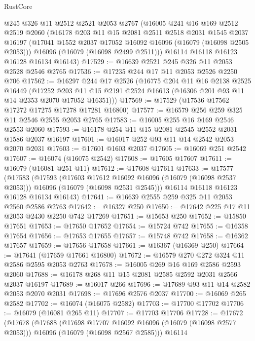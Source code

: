 \begin{lexlean}{RustCore}
\begin{coremodule}
    @245
    @326
    @11
    @2512
    @2521
    @2053
    @2767
    (@16005
      @241
      @16
      @169
      @2512
      @2519
      @2060
      (@16178
        @203
        @11
        @15
        @2081
        @2511
        @2518
        @2031
        @1545
        @2037
        @16197
        (@17041 @1552 @2037 @17052 @16092 @16096 (@16079 (@16098 @2505 @2053)))
        @16096
        (@16079 (@16098 @2499 @2511)))
      @16114
      @16118
      @16123
      @16128
      @16134
      @16143)
@17529 := @16639 @2521 @245 @326 @11 @2053 @2528 @2546 @2765
@17536 := @17235 @244 @17 @11 @2053 @2526 @2250 @706
@17562 := @16297
    @244
    @17
    @2526
    (@16775
      @204
      @11
      @16
      @2138
      @2525
      @16449
      (@17252 @203 @11 @15 @2191 @2524 @16613 (@16306 @201 @93 @11 @14 @2353 @2070 @17052 @16351)))
@17569 := @17529 (@17536 @17562 @17272 @17275 @17278 @17281 @16800)
@17577 := @16579 @256 @259 @325 @11 @2546 @2555 @2053 @2765
@17583 := @16005 @255 @16 @169 @2546 @2553 @2060
@17593 := @16178 @254 @11 @15 @2081 @2545 @2552 @2031 @1586 @2037 @16197
@17601 := @16017 @252 @93 @11 @14 @2542 @2053 @2070 @2031
@17603 := @17601 @1603 @2037
@17605 := @16069 @251 @2542
@17607 := @16074 (@16075 @2542)
@17608 := @17605 @17607
@17611 := @16079 (@16081 @251 @11)
@17612 := @17608 @17611
@17633 := @17577
    (@17583
      (@17593
        (@17603 @17612 @16092 @16096 (@16079 (@16098 @2537 @2053)))
        @16096
        (@16079 (@16098 @2531 @2545)))
      @16114
      @16118
      @16123
      @16128
      @16134
      @16143)
@17641 := @16639 @2555 @259 @325 @11 @2053 @2560 @2586 @2763
@17642 := @16327 @250
@17650 := @17642 @225 @17 @11 @2053 @2430 @2250 @742 @17269
@17651 := @15653 @250
@17652 := @15850 @17651
@17653 := @17650 @17652
@17654 := @15724 @742
@17655 := @16358 @17654
@17656 := @17653 @17655
@17657 := @15748 @742
@17658 := @16362 @17657
@17659 := @17656 @17658
@17661 := @16367 (@16369 @250)
@17664 := @17641 (@17659 @17661 @16800)
@17672 := @16579 @270 @272 @324 @11 @2586 @2595 @2053 @2763
@17678 := @16005 @269 @16 @169 @2586 @2593 @2060
@17688 := @16178 @268 @11 @15 @2081 @2585 @2592 @2031 @2566 @2037 @16197
@17689 := @16017 @266
@17696 := @17689 @93 @11 @14 @2582 @2053 @2070 @2031
@17698 := @17696 @2576 @2037
@17700 := @16069 @265 @2582
@17702 := @16074 (@16075 @2582)
@17703 := @17700 @17702
@17706 := @16079 (@16081 @265 @11)
@17707 := @17703 @17706
@17728 := @17672
    (@17678
      (@17688
        (@17698 @17707 @16092 @16096 (@16079 (@16098 @2577 @2053)))
        @16096
        (@16079 (@16098 @2567 @2585)))
      @16114

\end{coremodule}
\end{lexlean}

